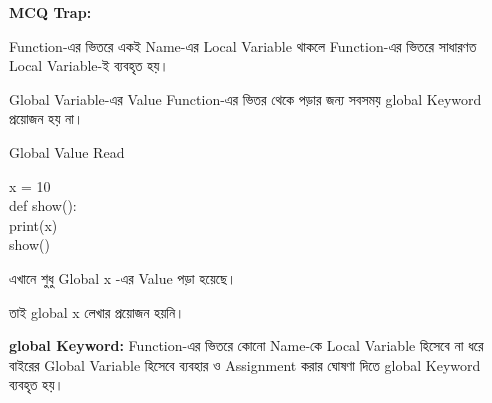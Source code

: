 \begin{rememberbox}

\textbf{\color{deepOrange}MCQ Trap:}

Function-এর ভিতরে একই Name-এর Local Variable থাকলে
Function-এর ভিতরে সাধারণত Local Variable-ই ব্যবহৃত হয়।

\end{rememberbox}



Global Variable-এর Value Function-এর ভিতর থেকে পড়ার জন্য
সবসময়
\textenglish{\ttfamily global}
Keyword প্রয়োজন হয় না।

\begin{codeoutputbox}{Global Value Read}

\noindent
\begin{minipage}[t]{0.52\linewidth}
\codeheading

\begin{english}
\ttfamily
x = 10\\[0.5mm]
def show():\\
\hspace*{4mm}print(x)\\[0.5mm]
show()
\end{english}

\end{minipage}
\hfill
\begin{minipage}[t]{0.44\linewidth}
\outputheading

\begin{center}
\textenglish{}
\end{center}

এখানে শুধু Global
\textenglish{\ttfamily x}
-এর Value পড়া হয়েছে।

তাই
\textenglish{\ttfamily global x}
লেখার প্রয়োজন হয়নি।

\end{minipage}

\end{codeoutputbox}



\begin{definitionbox}

\textbf{\textenglish{\ttfamily global} Keyword:}
Function-এর ভিতরে কোনো Name-কে Local Variable হিসেবে না ধরে
বাইরের Global Variable হিসেবে ব্যবহার ও Assignment করার ঘোষণা দিতে
\textenglish{\ttfamily global}
Keyword ব্যবহৃত হয়।

\end{definitionbox}

